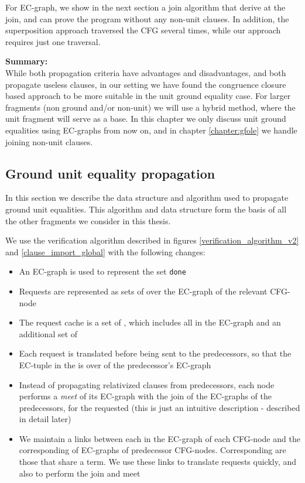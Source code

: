 \bigskip
\noindent
For EC-graph, we show in the next section a join algorithm that derive  at the join, 
and can prove the program without any non-unit clauses. 
In addition, the superposition approach traversed the CFG several times, while our approach requires just one traversal.


\bigskip
\noindent
\textbf{Summary:}\\
While both propagation criteria have advantages and disadvantages, and both propagate useless clauses, in our setting we have found the congruence closure based approach to be more suitable in the unit ground equality case.
For larger fragments (non ground and/or non-unit) we will use a hybrid method, where the unit fragment will serve as a base.
In this chapter we only discuss unit ground equalities using EC-graphs from now on, and in chapter \ref{chapter:gfole} we handle joining non-unit clauses.

\newpage
\subsection{Ground unit equality propagation}
In this section we describe the data structure and algorithm used to propagate ground unit equalities.
This algorithm and data structure form the basis of all the other fragments we consider in this thesis.


\bigskip
\noindent
We use the verification algorithm described in figures \ref{verification_algorithm_v2} and \ref{clause_import_global} with the following changes:
\begin{itemize}
\item An EC-graph is used to represent the set \lstinline|done|
\item Requests are represented as sets of \GFAs{} over the EC-graph of the relevant CFG-node
\item The request cache is a set of \GFAs{}, which includes all \GFAs{} in the EC-graph and an additional set of \GFAs{}
\item Each request is translated before being sent to the predecessors, so that the EC-tuple in the \GFA{} is over \GTs{} of the predecessor's EC-graph
\item Instead of propagating relativized clauses from predecessors, each node performs a \emph{meet} of its EC-graph with the join of the EC-graphs of the predecessors, for the requested \GFAs{} (this is just an intuitive description - described in detail later)
\item We maintain a links between each \GT{} in the EC-graph of each CFG-node and the corresponding \GTs{} of EC-graphs of predecessor CFG-nodes. Corresponding \GTs{} are those that share a term. We use these links to translate requests quickly, and also to perform the join and meet
\end{itemize}

